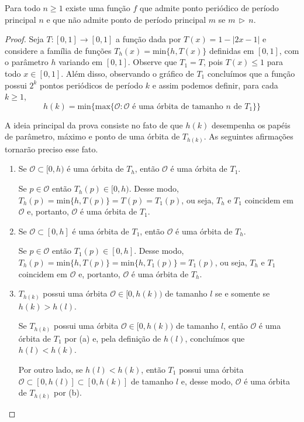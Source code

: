 \begin{theorem}
Para todo $n \geq 1$ existe uma função $f$ que admite ponto periódico de período principal $n$ e que não admite ponto de período principal $m$ se $m \,\triangleright\, n$.
\end{theorem}

\begin{proof}
Seja $T: [0,1] \to [0,1]$ a função dada por $T(x) = 1 - |2x - 1|$ e considere a família de funções $T_h(x) = \textrm{min}\{h, T(x)\}$ definidas em $[0,1]$, com o parâmetro $h$ variando em $[0,1]$. Observe que $T_1 = T$, pois $T(x) \leq 1$ para todo $x \in [0,1]$. Além disso, observando o gráfico de $T_1$ concluímos que a função possui $2^k$ pontos periódicos de período $k$ e assim podemos definir, para cada $k \geq 1$, $$h(k) = \textrm{min} \{ \textrm{max} \{ \mathcal{O} : \mathcal{O} \textrm{ é uma órbita de tamanho } n \textrm{ de } T_1\} \}$$

A ideia principal da prova consiste no fato de que $h(k)$ desempenha os papéis de parâmetro, máximo e ponto de uma órbita de $T_{h(k)}$. As seguintes afirmações tornarão preciso esse fato.

\begin{enumerate}[label = (\alph*)]
\item Se $\mathcal{O} \subset [0, h)$ é uma órbita de $T_h$, então $\mathcal{O}$ é uma órbita de $T_1$.

Se $p \in \mathcal{O}$ então $T_h(p) \in [0, h)$. Desse modo, $T_h(p) = \textrm{min}\{h, T(p)\} = T(p) = T_1(p)$, ou seja, $T_h$ e $T_1$ coincidem em $\mathcal{O}$ e, portanto, $\mathcal{O}$ é uma órbita de $T_1$.

\item Se $\mathcal{O} \subset [0, h]$ é uma órbita de $T_1$, então $\mathcal{O}$ é uma órbita de $T_h$.

Se $p \in \mathcal{O}$ então $T_1(p) \in [0, h]$. Desse modo, $T_h(p) = \textrm{min}\{h, T(p)\} = \textrm{min}\{h, T_1(p)\} = T_1(p)$, ou seja, $T_h$ e $T_1$ coincidem em $\mathcal{O}$ e, portanto, $\mathcal{O}$ é uma órbita de $T_h$.

\item $T_{h(k)}$ possui uma órbita $\mathcal{O} \in [0, h(k))$ de tamanho $l$ se e somente se $h(k) > h(l)$.

Se $T_{h(k)}$ possui uma órbita $\mathcal{O} \in [0, h(k))$ de tamanho $l$, então $\mathcal{O}$ é uma órbita de $T_1$ por (a) e, pela definição de $h(l)$, concluímos que $h(l) < h(k)$.

Por outro lado, se $h(l) < h(k)$, então $T_1$ possui uma órbita $\mathcal{O} \subset [0, h(l)] \subset [0, h(k)]$ de tamanho $l$ e, desse modo, $\mathcal{O}$ é uma órbita de $T_{h(k)}$ por (b).


\end{enumerate}
\end{proof}
